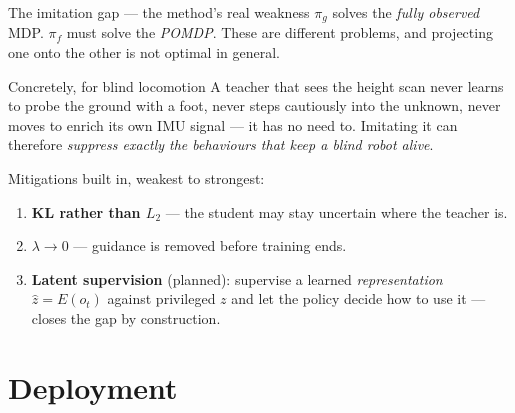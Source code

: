 \documentclass[aspectratio=169]{beamer}
\newcommand{\ot}{o_t}
\newcommand{\pf}{\pi_f}
\newcommand{\pg}{\pi_g}
\begin{document}
\begin{frame}{The imitation gap --- the method's real weakness}
  $\pg$ solves the \emph{fully observed} MDP. $\pf$ must solve the \emph{POMDP}. These are
  different problems, and projecting one onto the other is not optimal in general.

  \vspace{0.5em}
  \begin{alertblock}{Concretely, for blind locomotion}
    A teacher that sees the height scan never learns to probe the ground with a foot, never
    steps cautiously into the unknown, never moves to enrich its own IMU signal --- it has no
    need to. Imitating it can therefore \emph{suppress exactly the behaviours that keep a
    blind robot alive}.
  \end{alertblock}

  \vspace{0.2em}
  {\footnotesize Mitigations built in, weakest to strongest:}
  \begin{enumerate}\footnotesize
    \item \textbf{KL rather than $L_2$} --- the student may stay uncertain where the teacher is.
    \item \textbf{$\lambda \to 0$} --- guidance is removed before training ends.
    \item \textbf{Latent supervision} (planned): supervise a learned \emph{representation}
          $\hat{z} = E(\ot)$ against privileged $z$ and let the policy decide how to use it ---
          closes the gap by construction.
  \end{enumerate}
\end{frame}

\section{Deployment}
\end{document}
